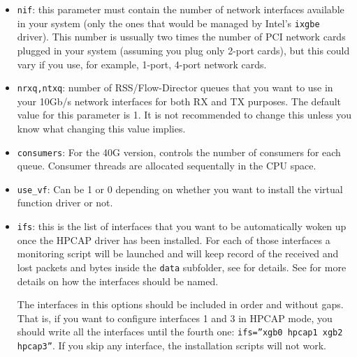 \documentclass[a4paper,oneside]{hpman}
\begin{document}
\begin{itemize}
    \item \texttt{nif}: this parameter must contain the number of network interfaces available in your system (only the ones that would be managed by Intel's \texttt{ixgbe} driver). This number is ussually two times the number of PCI network cards plugged in your system (assuming you plug only 2-port cards), but this could vary if you use, for example, 1-port, 4-port network cards.

    \item \texttt{nrxq,ntxq}: number of RSS/Flow-Director queues that you want to use in your 10Gb/s network interfaces for both RX and TX purposes. The default value for this parameter is 1. It is not recommended to change this unless you know what changing this value implies.

    \item \texttt{consumers}: For the 40G version, controls the number of consumers for each queue. Consumer threads are allocated sequentally in the CPU space.

    \item \texttt{use\_vf}: Can be 1 or 0 depending on whether you want to install the virtual function driver or not.

    \item \texttt{ifs}: this is the list of interfaces that you want to be automatically woken up once the HPCAP driver has been installed. For each of those interfaces a monitoring script will be launched and will keep record of the received and lost packets and bytes inside the \texttt{data} subfolder, see  for details. See  for more details on how the interfaces should be named.

    The interfaces in this options should be included in order and without gaps. That is, if you want to configure interfaces 1 and 3 in HPCAP mode, you should write all the interfaces until the fourth one: \texttt{ifs=''xgb0 hpcap1 xgb2 hpcap3''}. If you skip any interface, the installation scripts will not work.


\end{itemize}
\end{document}
